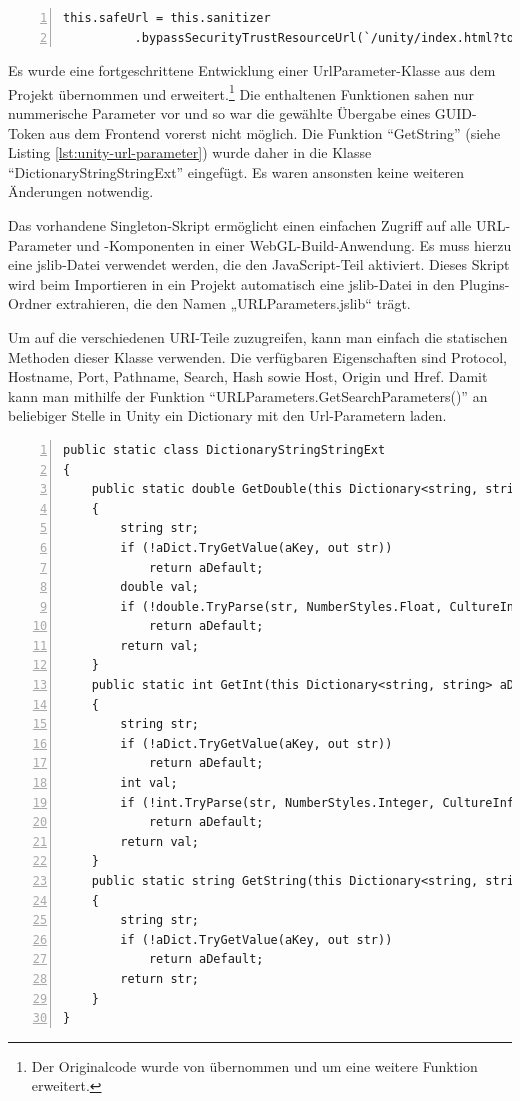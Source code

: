 \begin{lstlisting}[numbers=left,caption={IFrame for Unity in Frontend},label={lst:unity-url-parameter-in-action}]
this.safeUrl = this.sanitizer
          .bypassSecurityTrustResourceUrl(`/unity/index.html?token=${myToken}& server=${environment.apiConfig.uri}`);
\end{lstlisting}

Es wurde eine fortgeschrittene Entwicklung einer UrlParameter-Klasse aus dem Projekt übernommen und erweitert.\footnote{Der Originalcode wurde von \cite{UrlParameter} übernommen und um eine weitere Funktion erweitert.} Die enthaltenen Funktionen sahen nur nummerische Parameter vor und so war die gewählte Übergabe eines GUID-Token aus dem Frontend vorerst nicht möglich. Die Funktion ``GetString'' (siehe Listing \ref{lst:unity-url-parameter}) wurde daher in die Klasse ``DictionaryStringStringExt'' eingefügt. Es waren ansonsten keine weiteren Änderungen notwendig.

Das vorhandene Singleton-Skript ermöglicht einen einfachen Zugriff auf alle URL-Parameter und -Komponenten in einer WebGL-Build-Anwendung. Es muss hierzu eine jslib-Datei verwendet werden, die den JavaScript-Teil aktiviert. Dieses Skript wird beim Importieren in ein Projekt automatisch eine jslib-Datei in den Plugins-Ordner extrahieren, die den Namen „URLParameters.jslib“ trägt.

Um auf die verschiedenen URI-Teile zuzugreifen, kann man einfach die statischen Methoden dieser Klasse verwenden. Die verfügbaren Eigenschaften sind Protocol, Hostname, Port, Pathname, Search, Hash sowie Host, Origin und Href. Damit kann man mithilfe der Funktion ``URLParameters.GetSearchParameters()'' an beliebiger Stelle in Unity ein Dictionary mit den Url-Parametern laden.

\begin{lstlisting}[numbers=left,caption={UrlParameter},label={lst:unity-url-parameter}]
public static class DictionaryStringStringExt
{
    public static double GetDouble(this Dictionary<string, string> aDict, string aKey, double aDefault)
    {
        string str;
        if (!aDict.TryGetValue(aKey, out str))
            return aDefault;
        double val;
        if (!double.TryParse(str, NumberStyles.Float, CultureInfo.InvariantCulture, out val))
            return aDefault;
        return val;
    }
    public static int GetInt(this Dictionary<string, string> aDict, string aKey, int aDefault)
    {
        string str;
        if (!aDict.TryGetValue(aKey, out str))
            return aDefault;
        int val;
        if (!int.TryParse(str, NumberStyles.Integer, CultureInfo.InvariantCulture, out val))
            return aDefault;
        return val;
    }
    public static string GetString(this Dictionary<string, string> aDict, string aKey, string aDefault)
    {
        string str;
        if (!aDict.TryGetValue(aKey, out str))
            return aDefault;
        return str;
    }
}
\end{lstlisting}


